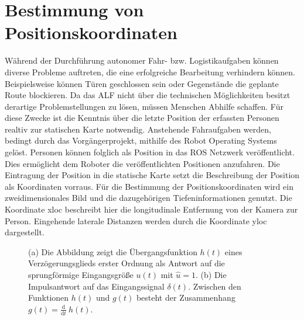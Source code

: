 	\section{Bestimmung von Positionskoordinaten}
		Während der Durchführung autonomer Fahr- bzw. Logistikaufgaben können diverse Probleme auftreten, die eine erfolgreiche Bearbeitung verhindern können. Beispielsweise können Türen geschlossen sein oder Gegenstände die geplante Route blockieren. Da das ALF nicht über die technischen Möglichkeiten besitzt derartige Problemstellungen zu lösen, müssen Menschen Abhilfe schaffen. Für diese Zwecke ist die Kenntnis über die letzte Position der erfassten Personen realtiv zur statischen Karte  notwendig. Anstehende Fahraufgaben werden, bedingt durch das Vorgängerprojekt, mithilfe des Robot Operating Systems gelöst. Personen können folglich als Position in das ROS Netzwerk veröffentlicht. Dies ermöglicht dem Roboter die veröffentlichten Positionen anzufahren. Die Eintragung der Position in die statische Karte setzt die Beschreibung der Position als Koordinaten vorraus. Für die Bestimmung der Positionskoordinaten wird ein zweidimensionales Bild und die dazugehörigen Tiefeninformationen genutzt. Die Koordinate xloc beschreibt hier die longitudinale Entfernung von der Kamera zur Person. Eingehende laterale Distanzen werden durch die Koordinate yloc dargestellt.
		
	\begin{figure}[H]
		\centering
		
		\caption{(a) Die Abbildung zeigt die Übergangsfunktion $h(t)$ eines Verzögerungsglieds erster Ordnung als Antwort auf die sprungförmige Eingangsgröße $u(t)$ mit $\hat{u}=1$. (b) Die Impulsantwort auf das Eingangssignal $\delta(t)$. Zwischen den Funktionen $h(t)$ und $g(t)$ besteht der Zusammenhang \mbox{$g(t)=\frac{\mathrm d}{\mathrm d t}\:h(t)$}.}
		\label{fig: antworten}
	\end{figure}
	     
	

